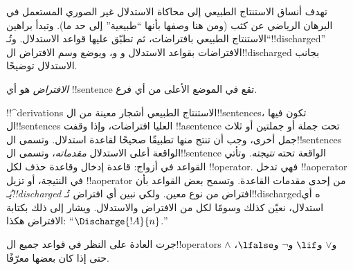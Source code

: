 \documentclass[../../../include/open-logic-section]{subfiles}
\begin{document}
      {}
      {}


\begin{explain}
تهدف أنساق الاستنتاج الطبيعي إلى محاكاة الاستدلال غير الصوري المستعمل
في البرهان الرياضي عن كثب (ومن هنا وصفها بأنها ``طبيعية'' إلى حد ما).
وتبدأ براهين الاستنتاج الطبيعي بافتراضات، ثم تطبّق عليها قواعد
الاستدلال. وتُـ``!!{discharged}'' الافتراضات بقواعد الاستدلال
\Intro{\lnot} و\Intro{\lif} و، ويوضع وسم الافتراض
ال!!{discharged} بجانب الاستدلال توضيحًا.
\end{explain}

\begin{defn}[الافتراض]
\emph{الافتراض} هو أي !!{sentence} تقع في الموضع الأعلى من أي فرع.
\end{defn}

!!^{derivation}s الاستنتاج الطبيعي أشجار معينة من ال!!{sentence}s،
تكون فيها ال!!{sentence}s العليا افتراضات، وإذا وقفت !!a{sentence} تحت
جملة أو جملتين أو ثلاث جمل أخرى، وجب أن تنتج منها تطبيقًا صحيحًا لقاعدة
استدلال. وتسمى ال!!{sentence}s الواقعة أعلى الاستدلال
\emph{مقدماته}، وتسمى ال!!{sentence} الواقعة تحته \emph{نتيجته}.
وتأتي القواعد في أزواج: قاعدة إدخال وقاعدة حذف لكل !!{operator}. فهي
تدخل !!a{operator} في النتيجة، أو تزيل !!a{operator} من إحدى مقدمات
القاعدة. وتسمح بعض القواعد بأن \emph{يُـ!!{discharged}} افتراض من نوع
معين. ولكي نبين أي افتراض تُـ!!{discharged}ه أي استدلال، نعيّن كذلك
وسومًا لكل من الافتراض والاستدلال. ويشار إلى ذلك بكتابة الافتراض هكذا:
``$\Discharge{!A}{n}$.''


%
	{جرت العادة على النظر في قواعد جميع ال!!{operator}s $\land$ و$\lor$ و$\lif$ و$\lnot$ و$\lfalse$، حتى إذا كان بعضها معرّفًا.}
\end{document}
